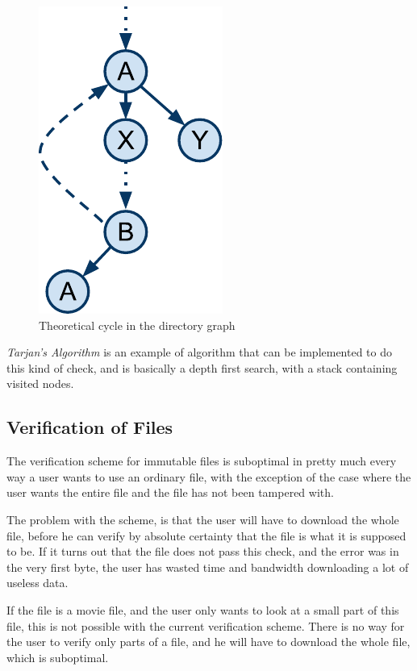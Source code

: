 \documentclass[pdftex,english,10pt,b5paper,twoside]{book}
\begin{document}
\begin{figure}[h!]
    \centering
    \includegraphics[scale=0.6]{CyclesintheDAG.pdf}
    \caption{Theoretical cycle in the directory graph}
    \label{fig:DSC:cycles}
\end{figure}

\emph{Tarjan's Algorithm} \cite{tarjan} is an example of algorithm that can be
implemented to do this kind of check, and is basically a depth first search,
with a stack containing visited nodes.

\subsection{Verification of Files}

The verification scheme for immutable files is suboptimal in pretty much every
way a user wants to use an ordinary file, with the exception of the case where
the user wants the entire file and the file has not been tampered with.

The problem with the scheme, is that the user will have to download the whole
file, before he can verify by absolute certainty that the file is what it is
supposed to be. If it turns out that the file does not pass this check, and
the error was in the very first byte, the user has wasted time and bandwidth
downloading a lot of useless data.

If the file is a movie file, and the user only wants to look at a
small part of this file, this is not possible with the current verification
scheme. There is no way for the user to verify only parts of a
file, and he will have to download the whole file, which is suboptimal.
\end{document}
